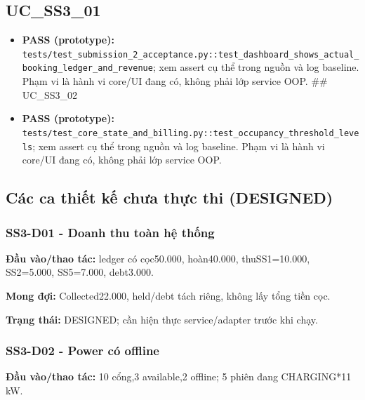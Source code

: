 \documentclass[11pt,a4paper]{article}
\begin{document}
\hypertarget{uc_ss3_01}{%
\subsection{UC\_SS3\_01}\label{uc_ss3_01}}

\begin{itemize}
\item
  \textbf{PASS (prototype):}
  \texttt{tests/test\_submission\_2\_acceptance.py::test\_dashboard\_shows\_actual\_booking\_ledger\_and\_revenue};
  xem assert cụ thể trong nguồn và log baseline. Phạm vi là hành vi
  core/UI đang có, không phải lớp service OOP. \#\# UC\_SS3\_02
\item
  \textbf{PASS (prototype):}
  \texttt{tests/test\_core\_state\_and\_billing.py::test\_occupancy\_threshold\_levels};
  xem assert cụ thể trong nguồn và log baseline. Phạm vi là hành vi
  core/UI đang có, không phải lớp service OOP.
\end{itemize}

\hypertarget{cuxe1c-ca-thiux1ebft-kux1ebf-chux1b0a-thux1ef1c-thi-designed}{%
\subsection{Các ca thiết kế chưa thực thi
(DESIGNED)}\label{cuxe1c-ca-thiux1ebft-kux1ebf-chux1b0a-thux1ef1c-thi-designed}}

\hypertarget{ss3-d01---doanh-thu-touxe0n-hux1ec7-thux1ed1ng}{%
\subsubsection{SS3-D01 - Doanh thu toàn hệ
thống}\label{ss3-d01---doanh-thu-touxe0n-hux1ec7-thux1ed1ng}}

\textbf{Đầu vào/thao tác:} ledger có cọc50.000, hoàn40.000,
thuSS1=10.000, SS2=5.000, SS5=7.000, debt3.000.

\textbf{Mong đợi:} Collected22.000, held/debt tách riêng, không lấy tổng
tiền cọc.

\textbf{Trạng thái:} DESIGNED; cần hiện thực service/adapter trước khi
chạy.

\hypertarget{ss3-d02---power-cuxf3-offline}{%
\subsubsection{SS3-D02 - Power có
offline}\label{ss3-d02---power-cuxf3-offline}}

\textbf{Đầu vào/thao tác:} 10 cổng,3 available,2 offline; 5 phiên đang
CHARGING*11 kW.
\end{document}

